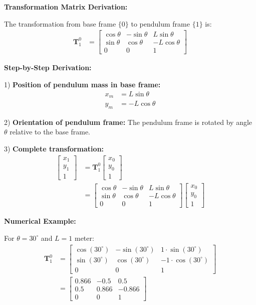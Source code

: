 \documentclass[11pt,a4paper]{article}
\begin{document}
\textbf{Transformation Matrix Derivation:}

The transformation from base frame $\{0\}$ to pendulum frame $\{1\}$ is:
\begin{align}
\bm{T}_1^0 &= \begin{bmatrix}
\cos\theta & -\sin\theta & L\sin\theta \\
\sin\theta & \cos\theta & -L\cos\theta \\
0 & 0 & 1
\end{bmatrix}
\end{align}

\textbf{Step-by-Step Derivation:}

1) \textbf{Position of pendulum mass in base frame:}
   \begin{align}
   x_m &= L\sin\theta \\
   y_m &= -L\cos\theta
   \end{align}

2) \textbf{Orientation of pendulum frame:}
   The pendulum frame is rotated by angle $\theta$ relative to the base frame.

3) \textbf{Complete transformation:}
   \begin{align}
   \begin{bmatrix} x_1 \\ y_1 \\ 1 \end{bmatrix} &= \bm{T}_1^0 \begin{bmatrix} x_0 \\ y_0 \\ 1 \end{bmatrix} \\
   &= \begin{bmatrix}
   \cos\theta & -\sin\theta & L\sin\theta \\
   \sin\theta & \cos\theta & -L\cos\theta \\
   0 & 0 & 1
   \end{bmatrix} \begin{bmatrix} x_0 \\ y_0 \\ 1 \end{bmatrix}
   \end{align}

\textbf{Numerical Example:}

For $\theta = 30^{\circ}$ and $L = 1$ meter:
\begin{align}
\bm{T}_1^0 &= \begin{bmatrix}
\cos(30^{\circ}) & -\sin(30^{\circ}) & 1 \cdot \sin(30^{\circ}) \\
\sin(30^{\circ}) & \cos(30^{\circ}) & -1 \cdot \cos(30^{\circ}) \\
0 & 0 & 1
\end{bmatrix} \\
&= \begin{bmatrix}
0.866 & -0.5 & 0.5 \\
0.5 & 0.866 & -0.866 \\
0 & 0 & 1
\end{bmatrix}
\end{align}
\end{document}
